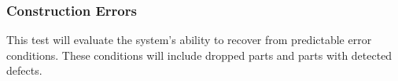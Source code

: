 \subsubsection{Construction Errors}
This test will evaluate the system's ability to recover from predictable error conditions. These conditions will include
dropped parts and parts with detected defects.